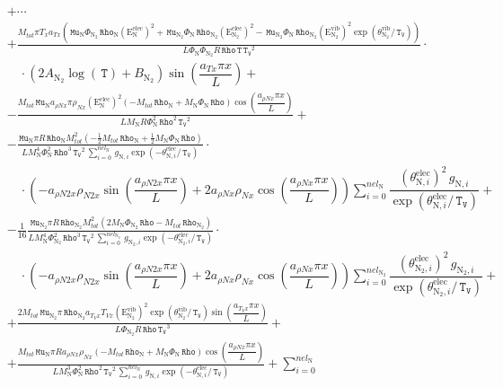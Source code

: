 \documentclass[10pt]{article}
\newcommand{\diff}[2] {\dfrac{\partial #1 }{\partial #2}}
\newcommand{\Rho}{\,\mathtt{Rho}}
\newcommand{\T}{\,\mathtt{T}}
\newcommand{\TV}{\,\mathtt{T_V}}
\newcommand{\N}{\text{N}}
\newcommand{\elec}{\text{elec}}
\newcommand{\vib}{\text{vib}}
\newcommand{\E}{\text{E}}
\newcommand{\Mu}{\, \mathtt{Mu}}
\newcommand{\mix}{\text{mix}\,}
\newcommand{\DKappaevDx}{\diff{\kappa^{ev}_{\mix}}{x}\,}
\newcommand{\eelecNden}{\,\sum_{i=0}^{nel_{\N}}   \, g_{\N,i}   \exp \left( -\theta^{\elec}_{\N,i} / \TV  \right) }
\newcommand{\eelecNdoisden}{\,\sum_{i=0}^{nel_{\N_2}}  \, g_{\N_2,i}   \exp \left( -\theta^{\elec}_{\N_2,i} /  \TV \right)}
\begin{document}
\begin{equation*}
\begin{split} %
&+\cdots\\
&+ \frac{M_{tot} \pi T_{x} a_{Tx} \left(\Mu_{\N} \Phi_{\N_2} \Rho_{\N} \left( \E^{\elec}_{\N} \right)^2 + \Mu_{\N_2} \Phi_{\N}
\Rho_{\N_2} \left( \E^{\elec}_{\N_2} \right)^2 - \Mu_{\N_2} \Phi_{\N} \Rho_{\N_2} \left( \E^{\vib}_{\N_2} \right)^2 \exp\left(
\theta^{\vib}_{\N_2} / \TV \right) \right)}{L \Phi_{\N} \Phi_{\N_2} R \Rho \T \TV^{2}} \cdot\\
 &\quad \cdot( 2 A_{\N_2} \log(\T)+B_{\N_2} ) \sin\left(\dfrac{a_{Tx} \pi x}{L}\right) +\\ 
%
&- \frac{M_{tot} \Mu_{\N} a_{\rho N x} \pi \rho_{N x} \left( \E^{\elec}_{\N} \right)^2 \left(- M_{tot} \Rho_{\N} + M_{\N}
\Phi_{\N} \Rho\right) \cos\left(\dfrac{a_{\rho N x} \pi x}{L}\right)}{L M_{\N} R \Phi_{\N}^{2} \Rho^{2} \TV^{2}} +\\ 
%
&- \frac{\Mu_{\N} \pi R \Rho_{\N} M_{tot}^{2} \left(- \frac{1}{2} M_{tot} \Rho_{\N} + \frac{1}{2} M_{\N} \Phi_{\N} \Rho\right) }{L
M_{\N}^{4} \Phi_{\N}^{2} \Rho^{3} \TV^{2} \eelecNden } \cdot\\
 &\quad \cdot\left(- a_{\rho N2 x} \rho_{N2 x} \sin\left(\dfrac{a_{\rho N2 x} \pi x}{L}\right) + 2 a_{\rho N x} \rho_{N x}
\cos\left(\dfrac{a_{\rho N x} \pi x}{L}\right)\right) \sum_{i=0}^{nel_{\N}} \dfrac{ \left( \theta^{\elec}_{\N,i} \right)^2   \,
g_{\N,i} }{ \exp \left( \theta^{\elec}_{\N,i} / \TV \right)}+\\ 
%
&- \frac{1}{16} \frac{\Mu_{\N_2} \pi R \Rho_{\N_2} M_{tot}^{2} \left(2 M_{\N} \Phi_{\N_2} \Rho - M_{tot} \Rho_{\N_2} \right)}{L
M_{\N}^{4} \Phi_{\N_2}^{2} \Rho^{3} \TV^{2} \eelecNdoisden} \cdot\\
 &\quad \cdot\left(- a_{\rho N2 x} \rho_{N2 x} \sin\left(\dfrac{a_{\rho N2 x} \pi x}{L}\right) + 2 a_{\rho N x} \rho_{N x}
\cos\left(\dfrac{a_{\rho N x} \pi x}{L}\right)\right)  \sum_{i=0}^{nel_{\N_2}} \dfrac{ \left( \theta^{\elec}_{\N_2,i} \right)^2  
\, g_{\N_2,i} }{ \exp \left( \theta^{\elec}_{\N_2,i} /  \TV \right)} +\\ 
%
&+ \frac{2 M_{tot} \Mu_{\N_2} \pi \Rho_{\N_2} a_{T_V x} T_{Vx} \left( \E^{\vib}_{\N_2} \right)^2 \exp\left( \theta^{\vib}_{\N_2} /
\TV \right) \sin\left(\dfrac{a_{T_V x} \pi x}{L}\right)}{L \Phi_{\N_2} R \Rho \TV^{3}} +\\ 
%
&+ \frac{M_{tot} \Mu_{\N} \pi R a_{\rho N x} \rho_{N x} \left(- M_{tot} \Rho_{\N} + M_{\N} \Phi_{\N} \Rho\right)
\cos\left(\dfrac{a_{\rho N x} \pi x}{L}\right)}{L M_{\N}^{3} \Phi_{\N}^{2} \Rho^{2} \TV^{2} \eelecNden} +\sum_{i=0}^{nel_{\N}}

\end{split}
\end{equation*}
\end{document}
